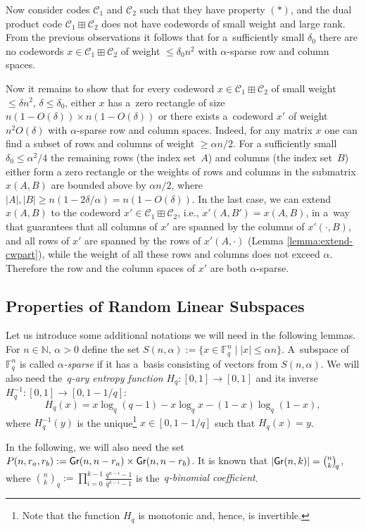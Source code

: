 \documentclass[11pt]{article}
\let\le\leqslant
\let\ge\geqslant
\theoremstyle{plain}
\theoremstyle{definition}
\theoremstyle{remark}
\newcommand{\NN}{\mathbb{N}}
\newcommand{\abs}[1]{\left\lvert #1 \right\rvert}
\newcommand{\cC}{\mathcal{C}}
\newcommand{\F}{\mathbb{F}}
\newcommand{\Gr}{{\sf Gr}}
\newcommand{\qbin}[2]{\binom{#1}{#2}_{\! q}}
\begin{document}
Now consider codes $\cC_1$ and $\cC_2$ such that they have property $(*)$, and the dual product code $\cC_1\boxplus \cC_2$ does not have codewords of small weight and large rank. From the previous observations it follows that for a~sufficiently small  $\delta_0$ there are no codewords $x\in \cC_1\boxplus \cC_2$ of weight $\le \delta_0 n^2$ with $\alpha$-sparse row and column spaces.

Now it remains to show that for every codeword $x\in \cC_1\boxplus \cC_2$ of small weight $\le\delta n^2$, $\delta\le\delta_0$, either $x$ has a~zero rectangle of size $n(1-O(\delta))\times n(1-O(\delta))$ or there exists a~codeword $x'$ of weight $n^2 O(\delta)$ with $\alpha$-sparse row and column spaces. Indeed, for any matrix $x$ one can find a subset of rows and columns of weight $\ge \alpha n/2$. For a sufficiently small  $\delta_0\le\alpha^2/4$ the remaining rows (the index set~$A$) and columns (the index set~$B$) either form a zero rectangle or the weights of rows and columns in the submatrix $x(A, B)$ are bounded above by $\alpha n/2$, where $|A|,|B|\ge n(1-2\delta/\alpha)=n(1-O(\delta))$. In the last case, we can extend $x(A, B)$ to the codeword $x'\in \cC_1\boxplus \cC_2$, i.e., $x'(A,B') = x(A,B)$, in a~way that guarantees that all columns  
of $x'$ are spanned by the columns of $x'(\cdot,B)$, and all rows of $x'$ are spanned by the rows of $x'(A,\cdot)$ (Lemma \ref{lemma:extend-cwpart}), while the weight of all these rows and columns does not exceed $\alpha$. Therefore the row and the column spaces of $x'$ are both $\alpha$-sparse. 


\subsection{Properties of Random Linear Subspaces}
Let us introduce some additional notations we will need in the following lemmas. For $n\in\NN$, $\alpha>0$ define the set $S(n,\alpha):=\{x\in \F_q^n\mid |x|\le\alpha n\}$. A~subspace of $\F_q^n$ is called \emph{$\alpha$-sparse} if it has a~basis consisting of vectors from $S(n,\alpha)$.
We will also need the~\emph{$q$-ary entropy function} $H_q:[0,1]\to [0,1]$ and its inverse $H_q^{-1}:[0,1]\to [0,1-1/q]$:
\[
    H_q(x) = x\log_q(q-1)-x\log_q x-(1-x)\log_q(1-x),
\]
where $H_q^{-1}(y)$ is the unique\footnote{Note that the function $H_q$ is monotonic and, hence, is invertible.} $x\in [0,1-1/q]$ such that $H_q(x)=y$.

In the following, we will also need the set $P(n,r_a,r_b):=\Gr(n,n-r_a)\times \Gr(n,n-r_b)$. It is known that $\abs{\Gr(n,k)} = \qbin{n}{k}$, where $\qbin{n}{k} := \prod_{i=0}^{k-1}\frac{q^{n-i}-1}{q^{k-i}-1}$ is the~\emph{$q$-binomial coefficient}.
\end{document}
